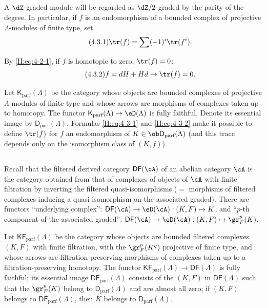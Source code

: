 \documentclass[oneside]{book}
\begin{document}
\subsection{}\label{II:4-3}

A $\dZ$-graded module will be regarded as $\dZ/2$-graded by the parity of
the degree. In particular, if $f$ is an endomorphism of a bounded complex of
projective $\Lambda$-modules of finite type, set
\begin{equation*}\tag{4.3.1}\label{II:eq:4-3-1}
  \tr(f) = \sum (-1)^i \tr(f^i) \text{.}
\end{equation*}

By \eqref{II:eq:4-2-1}, if $f$ is homotopic to zero, $\tr(f) = 0$:
\begin{equation*}\tag{4.3.2}\label{II:eq:4-3-2}
  f = d H + H d \rightarrow \tr(f) = 0 \text{.}
\end{equation*}

Let $\mathsf{K}_\text{parf}(\Lambda)$ be the category whose objects are
bounded complexes of projective $\Lambda$-modules of finite type and whose
arrows are morphisms of complexes taken up to homotopy. The functor
$\mathsf{K}_\text{parf}(\Lambda)\to\eD(\Lambda)$ is fully faithful. Denote its
essential image by $\mathsf{D}_\text{parf}(\Lambda)$. Formulas
\eqref{II:eq:4-3-1} and \eqref{II:eq:4-3-2} make it possible to define
$\tr(f)$ for $f$ an endomorphism of
$K\in\ob \mathsf{D}_\text{parf}(\Lambda)$ (and this trace depends only on the
isomorphism class of $(K,f)$).






\subsection{}\label{II:4-4}

Recall that the filtered derived category $\mathsf{DF}(\cA)$ of an abelian
category $\cA$ is the category obtained from that of complexes of objects of
$\cA$ with finite filtration by inverting the filtered quasi-isomorphisms
($=$ morphisms of filtered complexes inducing a quasi-isomorphism on the
associated graded). There are functors ``underlying complex'':
$\mathsf{DF}(\cA)\to\eD(\cA): (K,F)\mapsto K$, and ``$p$-th component of the
associated graded'':
$\mathsf{DF}(\cA)\to\eD(\cA): (K,F)\mapsto \gr_F^p(K)$.

Let $\mathsf{KF}_\text{parf}(\Lambda)$ be the category whose objects are
bounded filtered complexes $(K,F)$ with finite filtration, with the
$\gr_F^p(K^q)$ projective of finite type, and whose arrows are
filtration-preserving morphisms of complexes taken up to a
filtration-preserving homotopy. The functor
$\mathsf{KF}_\text{parf}(\Lambda)\to\mathsf{DF}(\Lambda)$ is fully faithful;
its essential image $\mathsf{DF}_\text{parf}(\Lambda)$ consists of the $(K,F)$ in
$\mathsf{DF}(\Lambda)$ such that the $\gr_F^p(K)$ belong to
$\mathsf{D}_\text{parf}(\Lambda)$ and are almost all zero; if $(K,F)$ belongs to
$\mathsf{DF}_\text{parf}(\Lambda)$, then $K$ belongs to
$\mathsf{D}_\text{parf}(\Lambda)$.
\end{document}
